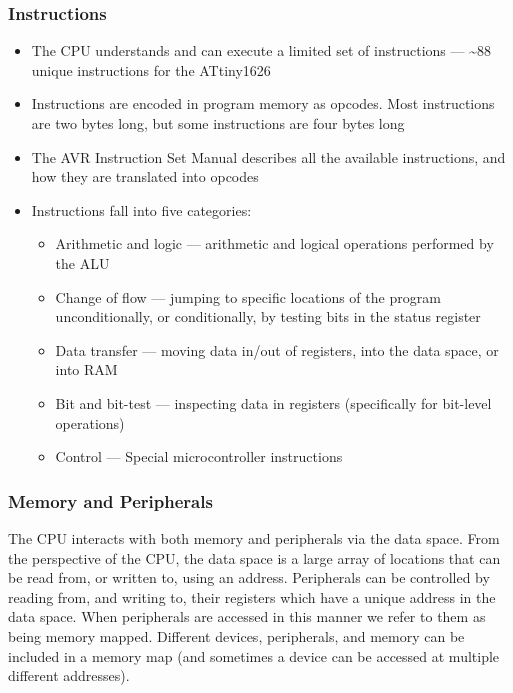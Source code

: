 \documentclass{article}
\begin{document}
\subsubsection{Instructions}
\begin{itemize}
    \item The CPU understands and can execute a limited set of
          instructions --- \textasciitilde88 unique instructions for
          the ATtiny1626
    \item Instructions are encoded in program memory as opcodes. Most
          instructions are two bytes long, but some instructions are
          four bytes long
    \item The AVR Instruction Set Manual describes all the available
          instructions, and how they are translated into opcodes
    \item Instructions fall into five categories:
          \begin{itemize}
              \item Arithmetic and logic --- arithmetic and logical
                    operations performed by the ALU
              \item Change of flow --- jumping to specific locations of
                    the program unconditionally, or conditionally, by
                    testing bits in the status register
              \item Data transfer --- moving data in/out of registers,
                    into the data space, or into RAM
              \item Bit and bit-test --- inspecting data in registers
                    (specifically for bit-level operations)
              \item Control --- Special microcontroller instructions
          \end{itemize}
\end{itemize}
\subsubsection{Memory and Peripherals}
The CPU interacts with both memory and peripherals via the data space.
From the perspective of the CPU, the data space is a large array of
locations that can be read from, or written to, using an address.
Peripherals can be controlled by reading from, and writing to, their
registers which have a unique address in the data space. When
peripherals are accessed in this manner we refer to them as being
memory mapped. Different devices, peripherals, and memory can be
included in a memory map (and sometimes a device can be accessed at
multiple different addresses).
\end{document}
